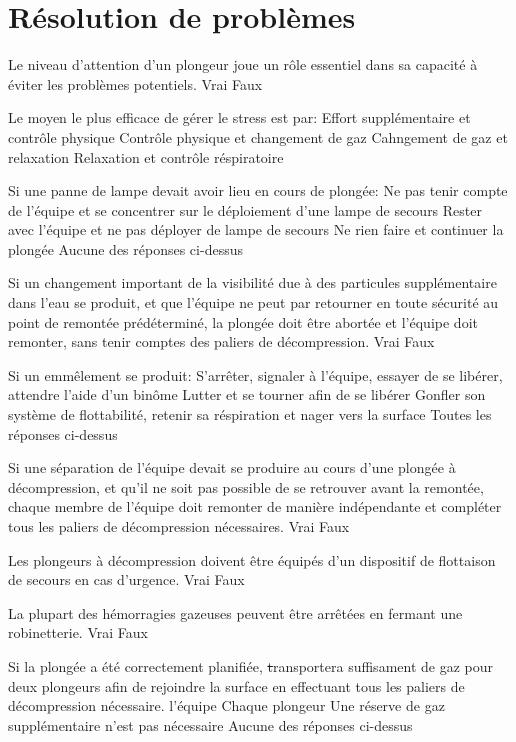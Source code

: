 \documentclass[english,10pt,a4paper,twoside]{article}
\begin{document}
	\section{Résolution de problèmes}
	\begin{outline}
		\1 Le niveau d'attention d'un plongeur joue un rôle essentiel dans sa capacité à éviter les problèmes potentiels.
			\2 Vrai
			\2 Faux

		\1 Le moyen le plus efficace de gérer le stress est par:
			\2 Effort supplémentaire et contrôle physique
			\2 Contrôle physique et changement de gaz
			\2 Cahngement de gaz et relaxation
			\2 Relaxation et contrôle réspiratoire

		\1 Si une panne de lampe devait avoir lieu en cours de plongée:
			\2 Ne pas tenir compte de l'équipe et se concentrer sur le déploiement d'une lampe de secours
			\2 Rester avec l'équipe et ne pas déployer de lampe de secours
			\2 Ne rien faire et continuer la plongée
			\2 Aucune des réponses ci-dessus

		\1 Si un changement important de la visibilité due à des particules supplémentaire dans l'eau se produit, et que l'équipe ne peut par retourner en toute sécurité au point de remontée prédéterminé, la plongée doit être abortée et l'équipe doit remonter, sans tenir comptes des paliers de décompression.
			\2 Vrai
			\2 Faux

		\1 Si un emmêlement se produit:
			\2 S'arrêter, signaler à l'équipe, essayer de se libérer, attendre l'aide d'un binôme
			\2 Lutter et se tourner afin de se libérer
			\2 Gonfler son système de flottabilité, retenir sa réspiration et nager vers la surface
			\2 Toutes les réponses ci-dessus

		\1 Si une séparation de l'équipe devait se produire au cours d'une plongée à décompression, et qu'il ne soit pas possible de se retrouver avant la remontée, chaque membre de l'équipe doit remonter de manière indépendante et compléter tous les paliers de décompression nécessaires.
			\2 Vrai
			\2 Faux

		\1 Les plongeurs à décompression doivent être équipés d'un dispositif de flottaison de secours en cas d'urgence. 
			\2 Vrai
			\2 Faux

		\1 La plupart des hémorragies gazeuses peuvent être arrêtées en fermant une robinetterie.
			\2 Vrai
			\2 Faux

		\1 Si la plongée a été correctement planifiée, \st transportera suffisament de gaz pour deux plongeurs afin de rejoindre la surface en effectuant tous les paliers de décompression nécessaire.
			\2 l'équipe
			\2 Chaque plongeur
			\2 Une réserve de gaz supplémentaire n'est pas nécessaire
			\2 Aucune des réponses ci-dessus


\end{outline}
\end{document}
